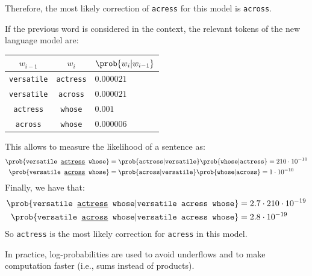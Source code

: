 \begin{example}
    Therefore, the most likely correction of \texttt{acress} for this model is \texttt{across}.

    If the previous word is considered in the context, the relevant tokens of the new language model are:
    \begin{table}[H]
        \centering
        \footnotesize
        \begin{tabular}{ccl}
            \toprule
            $w_{i-1}$ & $w_i$ & $\prob{w_i | w_{i-1}}$ \\
            \midrule
            \texttt{versatile} & \texttt{actress}   & $0.000021$ \\
            \texttt{versatile} & \texttt{across}    & $0.000021$ \\
            \texttt{actress}   & \texttt{whose}     & $0.001$ \\
            \texttt{across}    & \texttt{whose}     & $0.000006$ \\
            \bottomrule
        \end{tabular}
    \end{table}
    This allows to measure the likelihood of a sentence as:
    \[
        \begin{split}
            \prob{\texttt{versatile \underline{actress} whose}} &= \prob{\texttt{actress} | \texttt{versatile}} \prob{\texttt{whose} | \texttt{actress}} = 210 \cdot 10^{-10} \\
            \prob{\texttt{versatile \underline{across} whose}} &= \prob{\texttt{across} | \texttt{versatile}} \prob{\texttt{whose} | \texttt{across}} = 1 \cdot 10^{-10}
        \end{split}
    \]
    Finally, we have that:
    \[
        \begin{split}
            \prob{\texttt{versatile \underline{actress} whose} | \texttt{versatile acress whose}} &= 2.7 \cdot 210 \cdot 10^{-19} \\
            \prob{\texttt{versatile \underline{across} whose} | \texttt{versatile acress whose}} &= 2.8 \cdot 10^{-19} \\
        \end{split}
    \]
    So \texttt{actress} is the most likely correction for \texttt{acress} in this model.
\end{example}


\begin{remark}
    In practice, log-probabilities are used to avoid underflows and to make computation faster (i.e., sums instead of products).
\end{remark}



